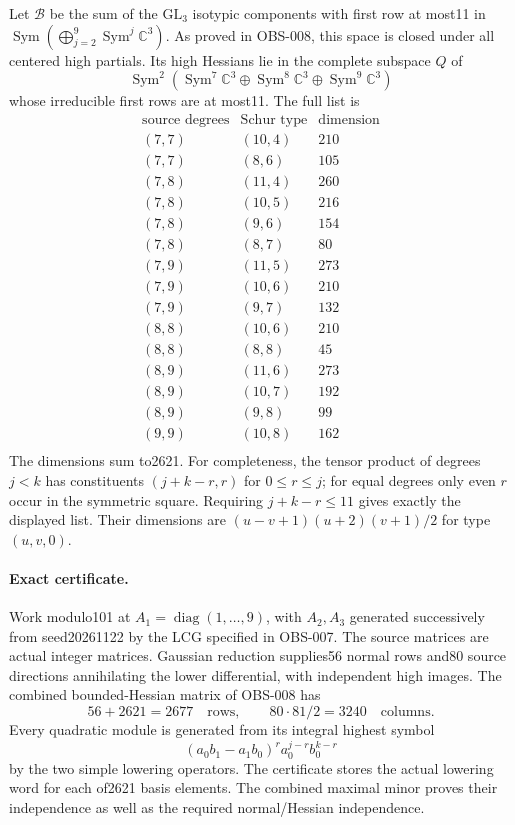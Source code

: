Let $\mathcal B$ be the sum of the $\mathrm{GL}_3$ isotypic components
with first row at most11 in
$\operatorname{Sym}(\bigoplus_{j=2}^{9}\operatorname{Sym}^j\mathbb C^3)$.
As proved in OBS-008, this space is closed under all centered high
partials. Its high Hessians lie in the complete subspace $Q$ of
\[
 \operatorname{Sym}^2
       (\operatorname{Sym}^7\mathbb C^3\oplus
        \operatorname{Sym}^8\mathbb C^3\oplus
        \operatorname{Sym}^9\mathbb C^3)
\]
whose irreducible first rows are at most11. The full list is
\[
\begin{array}{c|c|r}
 \text{source degrees}&\text{Schur type}&\text{dimension}\\\hline
 (7,7)&(10,4)&210\\
 (7,7)&(8,6)&105\\
 (7,8)&(11,4)&260\\
 (7,8)&(10,5)&216\\
 (7,8)&(9,6)&154\\
 (7,8)&(8,7)&80\\
 (7,9)&(11,5)&273\\
 (7,9)&(10,6)&210\\
 (7,9)&(9,7)&132\\
 (8,8)&(10,6)&210\\
 (8,8)&(8,8)&45\\
 (8,9)&(11,6)&273\\
 (8,9)&(10,7)&192\\
 (8,9)&(9,8)&99\\
 (9,9)&(10,8)&162\\
\end{array}
\]
The dimensions sum to2621. For completeness, the tensor product of
degrees $j<k$ has constituents $(j+k-r,r)$ for $0\leq r\leq j$;
for equal degrees only even $r$ occur in the symmetric square.
Requiring $j+k-r\leq11$ gives exactly the displayed list.
Their dimensions are
$(u-v+1)(u+2)(v+1)/2$ for type $(u,v,0)$.

\paragraph{Exact certificate.}
Work modulo101 at $A_1=\operatorname{diag}(1,\ldots,9)$, with
$A_2,A_3$ generated successively from seed20261122 by the LCG
specified in OBS-007. The source matrices are actual integer matrices.
Gaussian reduction supplies56 normal rows and80 source directions
annihilating the lower differential, with independent high images.
The combined bounded-Hessian matrix of OBS-008 has
\[
                 56+2621=2677\quad\text{rows},\qquad
                 80\cdot81/2=3240\quad\text{columns}.
\]
Every quadratic module is generated from its integral highest symbol
\[
 (a_0b_1-a_1b_0)^r a_0^{j-r}b_0^{k-r}
\]
by the two simple lowering operators. The certificate stores the
actual lowering word for each of2621 basis elements. The combined
maximal minor proves their independence as well as the required
normal/Hessian independence.

